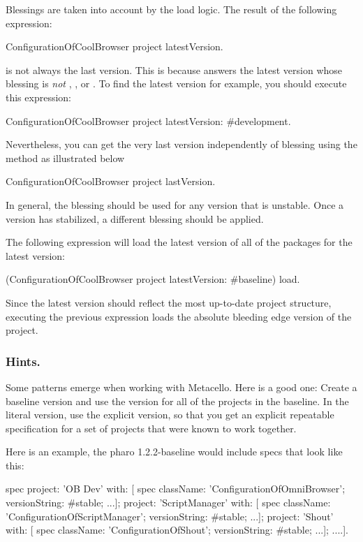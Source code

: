 \documentclass[a4paper,10pt,twoside]{book}
\begin{document}
Blessings are taken into account by the load logic. The result of the following expression:
\begin{code}{}
ConfigurationOfCoolBrowser project latestVersion.
\end{code}
is not always the last version.  This is because  answers the latest version whose blessing is {\em not} , , or . To find the latest  version for example, you should execute this expression:

\begin{code}{}
ConfigurationOfCoolBrowser project latestVersion: #development.
\end{code}

Nevertheless, you can get the very last version independently of blessing using the  method as illustrated below

\begin{code}{}
ConfigurationOfCoolBrowser project lastVersion.
\end{code}

In general, the  blessing should be used for any version that is unstable. Once a version has stabilized, a different blessing should be applied.

The following expression will load the latest version of all of the packages for the latest  version:
 \begin{code}{}
(ConfigurationOfCoolBrowser project latestVersion: #baseline) load.
\end{code}

Since the latest  version should reflect the most up-to-date project structure, executing the previous expression loads the absolute bleeding edge version of the project. 


\subsubsection{Hints.}
Some patterns emerge when working with Metacello. Here is a good one: 
Create a baseline version and use the  version for all of the projects in the baseline. In the literal version, use the explicit version, so that you get an explicit repeatable specification for a set of projects that were known to work together.

Here is an example, the pharo 1.2.2-baseline would include specs that look like this:

\begin{code}{}
 spec
    project: 'OB Dev' with: [
      spec
         className: 'ConfigurationOfOmniBrowser';
         versionString: #stable;
         ...];
    project: 'ScriptManager' with: [
      spec
         className: 'ConfigurationOfScriptManager';
         versionString: #stable;
         ...];
    project: 'Shout' with: [
      spec
         className: 'ConfigurationOfShout';
         versionString: #stable;
         ...];
    ....].
\end{code}
\end{document}
